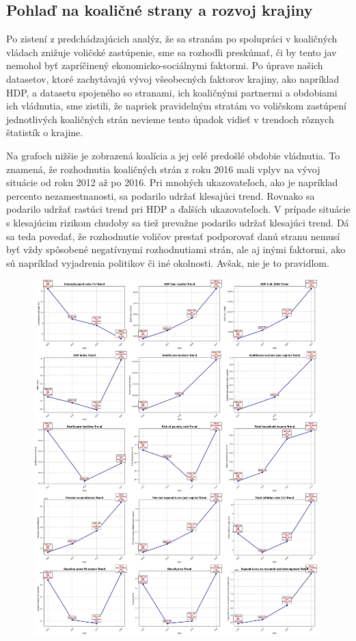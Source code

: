 \documentclass[report.tex]{subfiles}
\begin{document}
\subsection{Pohlaď na koaličné strany a rozvoj krajiny}

Po zistení z predchádzajúcich analýz, že sa stranám po spolupráci v koaličných vládach znižuje voličské zastúpenie, sme sa rozhodli preskúmať, či by tento jav nemohol byť zapríčinený ekonomicko-sociálnymi faktormi.
Po úprave našich datasetov, ktoré zachytávajú vývoj všeobecných faktorov krajiny, ako napríklad HDP, a datasetu spojeného so stranami, ich koaličnými partnermi a obdobiami ich vládnutia, sme zistili, že napriek pravidelným stratám vo voličskom zastúpení jednotlivých koaličných strán nevieme tento úpadok vidieť v trendoch rôznych štatistík o krajine.

Na grafoch nižšie je zobrazená koalícia a jej celé predošlé obdobie vládnutia. To znamená, že rozhodnutia koaličných strán z roku 2016 mali vplyv na vývoj situácie od roku 2012 až po 2016. Pri mnohých ukazovateľoch, ako je napríklad percento nezamestnanosti, sa podarilo udržať klesajúci trend. Rovnako sa podarilo udržať rastúci trend pri HDP a ďalších ukazovateľoch. V prípade situácie s klesajúcim rizikom chudoby sa tiež prevažne podarilo udržať klesajúci trend. Dá sa teda povedať, že rozhodnutie voličov prestať podporovať danú stranu nemusí byť vždy spôsobené negatívnymi rozhodnutiami strán, ale aj inými faktormi, ako sú napríklad vyjadrenia politikov či iné okolnosti. Avšak, nie je to pravidlom.  

\begin{figure}[H]
	\centering
	\includegraphics[width=0.98\textwidth]
	{images_exploratory/Coalition_Progress.png}
	\caption{}
\end{figure}
\end{document}

